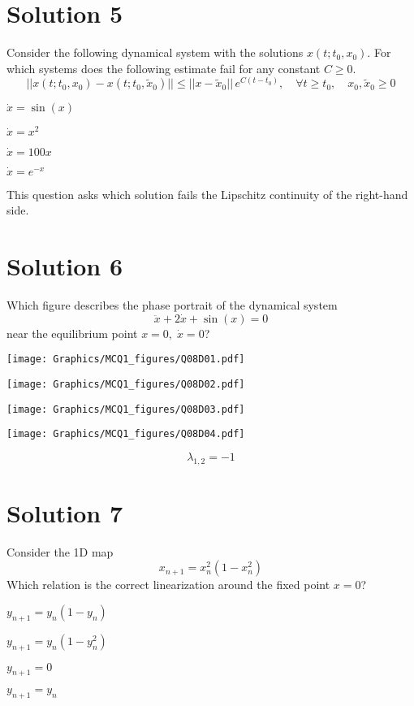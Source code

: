 \documentclass[twoside,10pt,a4paper]{article}
\begin{document}
\section*{Solution 5}
Consider the following dynamical system with the solutions $x(t; t_0, x_0)$. For which systems does the following estimate fail for any constant $C \geq 0$.
\begin{equation*}
	||x(t; t_0, x_0) - x(t; t_0, \tilde{x}_0) || \leq ||x - \tilde{x}_0||\,e^{C(t-t_0)}, \quad \forall t \geq t_0, \quad x_0, \tilde{x}_0 \geq 0
\end{equation*}

\begin{enumerate}[label=(\alph*)]
	\item $ \dot{x} = \sin(x) $
	\item $ \dot{x} = x^2 $
	\item $ \dot{x} = 100x $
	{\color{MyRed}\item $ \dot{x} = e^{-x} $}
\end{enumerate}
{\color{MyRed} This question asks which solution fails the Lipschitz continuity of the right-hand side.}

\section*{Solution 6}
Which figure describes the phase portrait of the dynamical system
\begin{equation*}
	\ddot{x} + 2\dot{x} + \sin(x) = 0
\end{equation*}
near the equilibrium point $x = 0, \; \dot{x} = 0$?

\begin{enumerate}[label=(\alph*)]
	\item \texttt{[image: Graphics/MCQ1\_figures/Q08D01.pdf]}
	\item \texttt{[image: Graphics/MCQ1\_figures/Q08D02.pdf]}
	\item \texttt{[image: Graphics/MCQ1\_figures/Q08D03.pdf]}
	{\color{MyRed}\item \texttt{[image: Graphics/MCQ1\_figures/Q08D04.pdf]}}
\end{enumerate}

{\color{MyRed}
\begin{equation*}
	\lambda_{1,2} = -1
\end{equation*}
}

\newpage

\section*{Solution 7}
Consider the 1D map
\begin{equation*}
	x_{n+1} = x_n^2(1 - x_n^2)
\end{equation*}
Which relation is the correct linearization around the fixed point $x = 0$?

\begin{enumerate}[label=(\alph*)]
	\item $ y_{n+1} = y_n(1 - y_n) $
	\item $ y_{n+1} = y_n(1 - y_n^2) $
	{\color{MyRed}\item $ y_{n+1} = 0 $}
	\item $ y_{n+1} = y_n $
\end{enumerate}
\end{document}
